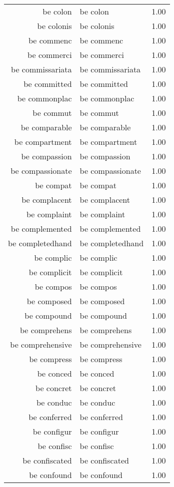 \begin{table}[ht]
\begin{tabular}{rlr}
  be colon & be colon & 1.00 \\ 
  be colonis & be colonis & 1.00 \\ 
  be commenc & be commenc & 1.00 \\ 
  be commerci & be commerci & 1.00 \\ 
  be commissariata & be commissariata & 1.00 \\ 
  be committed & be committed & 1.00 \\ 
  be commonplac & be commonplac & 1.00 \\ 
  be commut & be commut & 1.00 \\ 
  be comparable & be comparable & 1.00 \\ 
  be compartment & be compartment & 1.00 \\ 
  be compassion & be compassion & 1.00 \\ 
  be compassionate & be compassionate & 1.00 \\ 
  be compat & be compat & 1.00 \\ 
  be complacent & be complacent & 1.00 \\ 
  be complaint & be complaint & 1.00 \\ 
  be complemented & be complemented & 1.00 \\ 
  be completedhand & be completedhand & 1.00 \\ 
  be complic & be complic & 1.00 \\ 
  be complicit & be complicit & 1.00 \\ 
  be compos & be compos & 1.00 \\ 
  be composed & be composed & 1.00 \\ 
  be compound & be compound & 1.00 \\ 
  be comprehens & be comprehens & 1.00 \\ 
  be comprehensive & be comprehensive & 1.00 \\ 
  be compress & be compress & 1.00 \\ 
  be conced & be conced & 1.00 \\ 
  be concret & be concret & 1.00 \\ 
  be conduc & be conduc & 1.00 \\ 
  be conferred & be conferred & 1.00 \\ 
  be configur & be configur & 1.00 \\ 
  be confisc & be confisc & 1.00 \\ 
  be confiscated & be confiscated & 1.00 \\ 
  be confound & be confound & 1.00 \\ 

\end{tabular}
\end{table}
